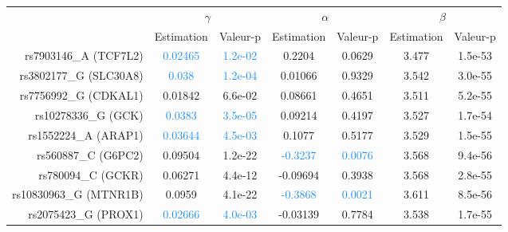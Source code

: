 \documentclass[11pt, a4paper]{article}
\begin{document}
\begin{table}[ht]
    \begin{center}
        \begin{tabular}{rcccccc}
            \hline
            & \multicolumn{2}{c}{$\gamma$} & \multicolumn{2}{c}{$\alpha$} & \multicolumn{2}{c}{$\beta$} \\
            & Estimation & Valeur-p & Estimation & Valeur-p & Estimation & Valeur-p \\
            \hline
                rs7903146\_A (TCF7L2) & \textcolor{dodgerblue}{0.02465} & \textcolor{dodgerblue}{1.2e-02} & 0.2204 & 0.0629 & \textcolor{firebrick2}{3.477} & \textcolor{firebrick2}{1.5e-53} \\
                rs3802177\_G (SLC30A8) & \textcolor{dodgerblue}{0.038} & \textcolor{dodgerblue}{1.2e-04} & 0.01066 & 0.9329 & \textcolor{firebrick2}{3.542} & \textcolor{firebrick2}{3.0e-55} \\
                rs7756992\_G (CDKAL1) & 0.01842 & 6.6e-02 & 0.08661 & 0.4651 & \textcolor{firebrick2}{3.511} & \textcolor{firebrick2}{5.2e-55} \\
                rs10278336\_G (GCK) & \textcolor{dodgerblue}{0.0383} & \textcolor{dodgerblue}{3.5e-05} & 0.09214 & 0.4197 & \textcolor{firebrick2}{3.527} & \textcolor{firebrick2}{1.7e-54} \\
                rs1552224\_A (ARAP1) & \textcolor{dodgerblue}{0.03644} & \textcolor{dodgerblue}{4.5e-03} & 0.1077 & 0.5177 & \textcolor{firebrick2}{3.529} & \textcolor{firebrick2}{1.5e-55} \\
                rs560887\_C (G6PC2) & \textcolor{firebrick2}{0.09504} & \textcolor{firebrick2}{1.2e-22} & \textcolor{dodgerblue}{-0.3237} & \textcolor{dodgerblue}{0.0076} & \textcolor{firebrick2}{3.568} & \textcolor{firebrick2}{9.4e-56} \\
                rs780094\_C (GCKR) & \textcolor{firebrick2}{0.06271} & \textcolor{firebrick2}{4.4e-12} & -0.09694 & 0.3938 & \textcolor{firebrick2}{3.568} & \textcolor{firebrick2}{2.8e-55} \\
                rs10830963\_G (MTNR1B) & \textcolor{firebrick2}{0.0959} & \textcolor{firebrick2}{4.1e-22} & \textcolor{dodgerblue}{-0.3868} & \textcolor{dodgerblue}{0.0021} & \textcolor{firebrick2}{3.611} & \textcolor{firebrick2}{8.5e-56} \\
                rs2075423\_G (PROX1) & \textcolor{dodgerblue}{0.02666} & \textcolor{dodgerblue}{4.0e-03} & -0.03139 & 0.7784 & \textcolor{firebrick2}{3.538} & \textcolor{firebrick2}{1.7e-55} \\

\end{tabular}
\end{center}
\end{table}
\end{document}
